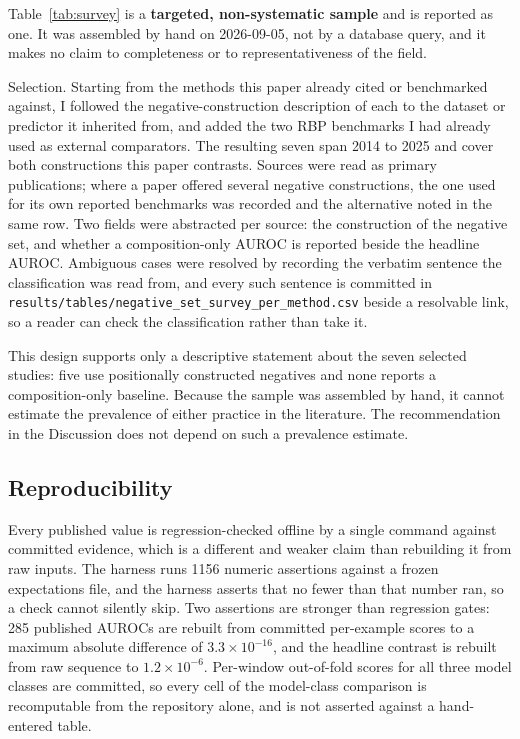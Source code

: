 Table~\ref{tab:survey} is a \textbf{targeted, non-systematic sample} and is reported as one.
It was assembled by hand on 2026-09-05, not by a database query, and it makes no claim to
completeness or to representativeness of the field.

Selection. Starting from the methods this paper already cited or benchmarked against, I
followed the negative-construction description of each to the dataset or predictor it inherited
from, and added the two RBP benchmarks I had already used as external comparators. The
resulting seven span 2014 to 2025 and cover both constructions this paper contrasts. Sources
were read as primary publications; where a paper offered several negative constructions, the one
used for its own reported benchmarks was recorded and the alternative noted in the same row.
Two fields were abstracted per source: the construction of the negative set, and whether a
composition-only AUROC is reported beside the headline AUROC. Ambiguous cases were resolved by
recording the verbatim sentence the classification was read from, and every such sentence is
committed in \texttt{results/tables/negative\_set\_survey\_per\_method.csv} beside a resolvable
link, so a reader can check the classification rather than take it.

This design supports only a descriptive statement about the seven selected studies: five use
positionally constructed negatives and none reports a composition-only baseline. Because the
sample was assembled by hand, it cannot estimate the prevalence of either practice in the
literature. The recommendation in the Discussion does not depend on such a prevalence estimate.

\subsection{Reproducibility}
\label{sec:repro}

Every published value is regression-checked offline by a single command against committed
evidence, which is a different and weaker claim than rebuilding it from raw inputs. The
harness runs 1156 numeric assertions against a frozen expectations file, and the harness asserts
that no
fewer than that number ran, so a check cannot silently skip. Two assertions are
stronger than regression gates: 285 published AUROCs are rebuilt from committed per-example
scores to a maximum absolute difference of $3.3\times10^{-16}$, and the headline contrast is
rebuilt from raw sequence to $1.2\times10^{-6}$. Per-window out-of-fold scores for all three
model classes are committed, so every cell of the model-class comparison is recomputable from the
repository alone, and is not asserted against a hand-entered table.

